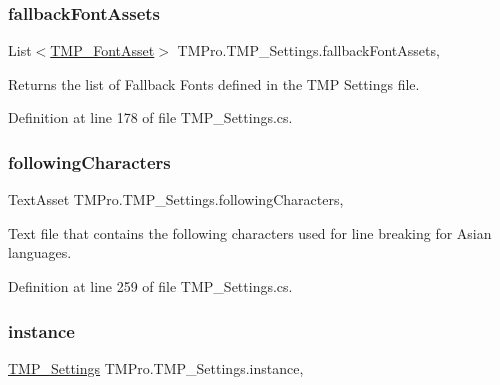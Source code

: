 \subsubsection{\texorpdfstring{fallbackFontAssets}{fallbackFontAssets}}
{\footnotesize\ttfamily List$<$\mbox{\hyperlink{class_t_m_pro_1_1_t_m_p___font_asset}{T\+M\+P\+\_\+\+Font\+Asset}}$>$ T\+M\+Pro.\+T\+M\+P\+\_\+\+Settings.\+fallback\+Font\+Assets\hspace{0.3cm}{\ttfamily [static]}, {\ttfamily [get]}}



Returns the list of Fallback Fonts defined in the T\+MP Settings file. 



Definition at line 178 of file T\+M\+P\+\_\+\+Settings.\+cs.

\mbox{\label{class_t_m_pro_1_1_t_m_p___settings_a05637d0bf743beb9317c129c960bc654}} 
\subsubsection{\texorpdfstring{followingCharacters}{followingCharacters}}
{\footnotesize\ttfamily Text\+Asset T\+M\+Pro.\+T\+M\+P\+\_\+\+Settings.\+following\+Characters\hspace{0.3cm}{\ttfamily [static]}, {\ttfamily [get]}}



Text file that contains the following characters used for line breaking for Asian languages. 



Definition at line 259 of file T\+M\+P\+\_\+\+Settings.\+cs.

\mbox{\label{class_t_m_pro_1_1_t_m_p___settings_a27bd5ea027ced6add42d15cc09d2925b}} 
\subsubsection{\texorpdfstring{instance}{instance}}
{\footnotesize\ttfamily \mbox{\hyperlink{class_t_m_pro_1_1_t_m_p___settings}{T\+M\+P\+\_\+\+Settings}} T\+M\+Pro.\+T\+M\+P\+\_\+\+Settings.\+instance\hspace{0.3cm}{\ttfamily [static]}, {\ttfamily [get]}}



